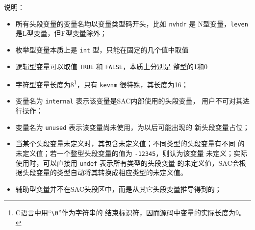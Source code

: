 说明：
\begin{itemize}
\item 所有头段变量的变量名均以变量类型码开头，比如 \texttt{nvhdr} 是
    N型变量，\texttt{leven} 是L型变量，但F型变量除外；
\item 枚举型变量本质上是 \texttt{int} 型，只能在固定的几个值中取值
\item 逻辑型变量可以取值 \texttt{TRUE} 和 \texttt{FALSE}，本质上分别是
    整型的1和0
\item 字符型变量长度为8\footnote{C语言中用``\verb|\0|''作为字符串的
    结束标识符，因而源码中变量的实际长度为9。}，只有 \texttt{kevnm}
    很特殊，其长度为16；
\item 变量名为 \texttt{internal} 表示该变量是SAC内部使用的头段变量，
    用户不可对其进行操作；
\item 变量名为 \texttt{unused} 表示该变量尚未使用，为以后可能出现的
    新头段变量占位；
\item 当某个头段变量未定义时，其包含未定义值；不同类型的头段变量有不同
    的未定义值；若一个整型头段变量的值为 \texttt{-12345}，则认为该变量
    未定义；实际使用时，可以直接用 \texttt{undef} 表示所有类型的头段变量
    的未定义值，SAC会根据头段变量的类型自动将其转换成相应类型的未定义值。
\item 辅助型变量并不在SAC头段区中，而是从其它头段变量推导得到的；
\end{itemize}
